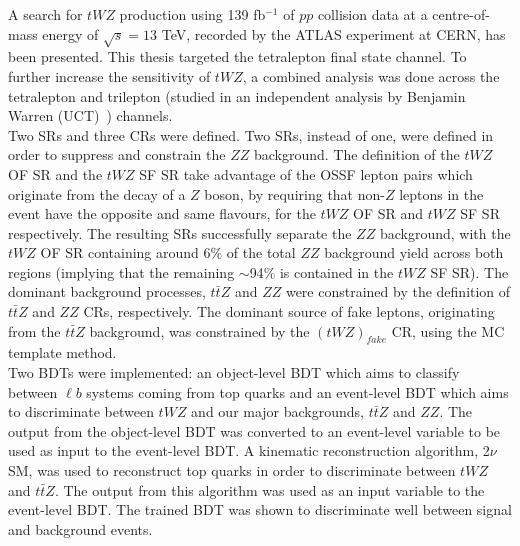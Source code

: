  


A search for $tWZ$ production using 139 fb$^{-1}$ of $pp$ collision data at a centre-of-mass energy of $\sqrt{s} = 13$ TeV, recorded by the ATLAS experiment at CERN, has been presented. This thesis targeted the tetralepton final state channel. To further increase the sensitivity of $tWZ$, a combined analysis was done across the tetralepton and trilepton (studied in an independent analysis by Benjamin Warren (UCT)~\cite{ben-thesis}) channels.\\

Two SRs and three CRs were defined. Two SRs, instead of one, were defined in order to suppress and constrain the $ZZ$ background. The definition of the $tWZ$ OF SR and the $tWZ$ SF SR take advantage of the OSSF lepton pairs which originate from the decay of a $Z$ boson, by requiring that non-$Z$ leptons in the event have the opposite and same flavours, for the $tWZ$ OF SR and $tWZ$ SF SR respectively. The resulting SRs successfully separate the $ZZ$ background, with the $tWZ$ OF SR containing around 6$\%$ of the total $ZZ$ background yield across both regions (implying that the remaining $\sim$94$\%$ is contained in the $tWZ$ SF SR). The dominant background processes, $t\bar{t}Z $ and $ZZ$ were constrained by the definition of $t\bar{t}Z$ and $ZZ$ CRs, respectively. The dominant source of fake leptons, originating from the $t\bar{t}Z$ background, was constrained by the $(tWZ)_{fake}$ CR, using the MC template method.\\

Two BDTs were implemented: an object-level BDT which aims to classify between $\ell b$ systems coming from top quarks and an event-level BDT which aims to discriminate between $tWZ$ and our major backgrounds, $t\bar{t}Z$ and $ZZ$. The output from the object-level BDT was converted to an event-level variable to be used as input to the event-level BDT. A kinematic reconstruction algorithm, 2$\nu$SM, was used to reconstruct top quarks in order to discriminate between $tWZ$ and $t\bar{t}Z$. The output from this algorithm was used as an input variable to the event-level BDT. The trained BDT was shown to discriminate well between signal and background events.\\

